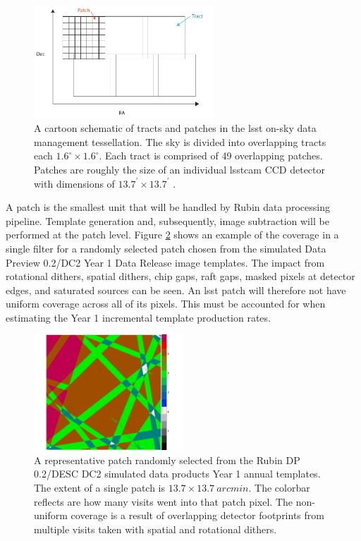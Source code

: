 \documentclass[preprintm,linenumbers]{aastex631}
\begin{document}
	\begin{figure}
		\centering
		\includegraphics[width=0.6\textwidth]{results/tracts_and_patches.pdf} 
		
		\caption{A cartoon schematic of tracts and patches in the \gls*{lsst} on-sky data management tessellation.
  The sky is divided into overlapping tracts each $1.6^{\circ} \times 1.6^{\circ}$. 
  Each tract is comprised of 49 overlapping patches. 
  Patches are roughly the size of an individual \gls*{lsstcam} CCD detector with dimensions of $13.7^{\prime} \times 13.7^{\prime}$ . }
		
		\label{fig:tractsandpatches}
	\end{figure}
	
	A patch is the smallest unit that will be handled by Rubin data processing pipeline. 
 Template generation and, subsequently, image subtraction will be performed at the patch level. 
 Figure \ref{fig:randompatch} shows an example of the coverage in a single filter for a randomly selected patch chosen from the simulated Data Preview 0.2/DC2 \citep{2021ApJS..253...31L}  Year 1 Data Release image templates. 
 The impact from rotational dithers, spatial dithers, chip gaps, raft gaps, masked pixels at detector edges, and saturated sources can be seen. An \gls*{lsst} patch will therefore not have uniform coverage across all of its pixels. This must be accounted for when estimating the Year 1 incremental template production rates. 
	
	\begin{figure}
		\centering
		\includegraphics[width=0.5\textwidth]{results/dc2-random_single_patch_year1_coadd_depth.pdf} 
		
		\caption{A representative patch randomly selected from the Rubin DP 0.2/DESC DC2  \citep{2021ApJS..253...31L} simulated data products Year 1 annual templates. 
			The extent of a single patch is $13.7 \times 13.7\ \si{arcmin}$.
			The colorbar reflects are how many visits went into that patch pixel.
   The non-uniform coverage is a result of  overlapping detector footprints from multiple visits taken with spatial and rotational dithers.}
		
		\label{fig:randompatch}
	\end{figure}
	
\end{document}
